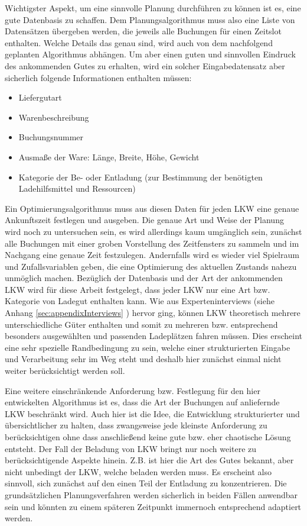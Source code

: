 Wichtigster Aspekt, um eine sinnvolle Planung durchführen zu können ist es, eine gute Datenbasis zu schaffen. Dem Planungsalgorithmus muss also eine Liste von Datensätzen übergeben werden, die jeweils alle Buchungen für einen Zeitslot enthalten. Welche Details das genau sind, wird auch von dem nachfolgend geplanten Algorithmus abhängen. Um aber einen guten und sinnvollen Eindruck des ankommenden Gutes zu erhalten, wird ein solcher Eingabedatensatz aber sicherlich folgende Informationen enthalten müssen:
\begin{itemize}
    \item Liefergutart
    \item Warenbeschreibung
    \item Buchungsnummer
    \item Ausmaße der Ware: Länge, Breite, Höhe, Gewicht
    \item Kategorie der Be- oder Entladung (zur Bestimmung der benötigten Ladehilfsmittel und Ressourcen)
\end{itemize}
Ein Optimierungsalgorithmus muss aus diesen Daten für jeden LKW eine genaue Ankunftszeit festlegen und ausgeben. Die genaue Art und Weise der Planung wird noch zu untersuchen sein, es wird allerdings kaum umgänglich sein, zunächst alle Buchungen mit einer groben Vorstellung des Zeitfensters zu sammeln und im Nachgang eine genaue Zeit festzulegen. Andernfalls wird es wieder viel Spielraum und Zufallsvariablen geben, die eine Optimierung des aktuellen Zustands nahezu unmöglich machen. Bezüglich der Datenbasis und der Art der ankommenden LKW wird für diese Arbeit festgelegt, dass jeder LKW nur eine Art bzw. Kategorie von Ladegut enthalten kann. Wie aus Experteninterviews (siehe Anhang \ref{sec:appendixInterviews} ) hervor ging, können LKW theoretisch mehrere unterschiedliche Güter enthalten und somit zu mehreren bzw. entsprechend besonders ausgewählten und passenden Ladeplätzen fahren müssen. Dies erscheint eine sehr spezielle Randbedingung zu sein, welche einer strukturierten Eingabe und Verarbeitung sehr im Weg steht und deshalb hier zunächst einmal nicht weiter berücksichtigt werden soll.

Eine weitere einschränkende Anforderung bzw. Festlegung für den hier entwickelten Algorithmus ist es, dass die Art der Buchungen auf anliefernde LKW beschränkt wird. Auch hier ist die Idee, die Entwicklung strukturierter und übersichtlicher zu halten, dass zwangsweise jede kleinste Anforderung zu berücksichtigen ohne dass anschließend keine gute bzw. eher chaotische Lösung entsteht. Der Fall der Beladung von LKW bringt nur noch weitere zu berücksichtigende Aspekte hinein. Z.B. ist hier die Art des Gutes bekannt, aber nicht unbedingt der LKW, welche beladen werden muss. Es erscheint also sinnvoll, sich zunächst auf den einen Teil der Entladung zu konzentrieren. Die grundsätzlichen Planungsverfahren werden sicherlich in beiden Fällen anwendbar sein und könnten zu einem späteren Zeitpunkt immernoch entsprechend adaptiert werden.

